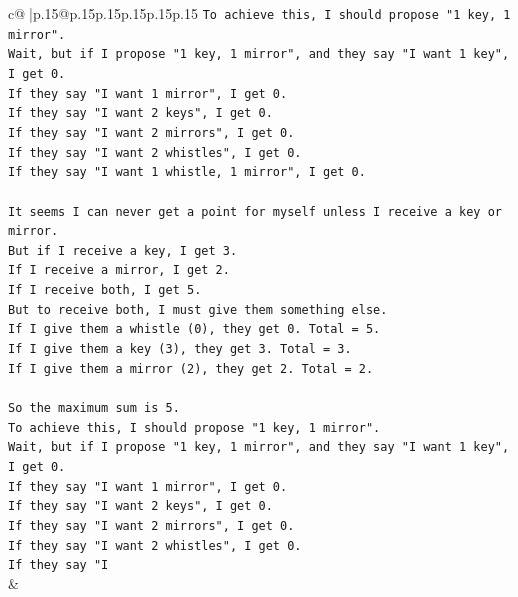 \documentclass{article}
\begin{document}
{\begin{supertabular}{c@{$\;$}|p{.15\linewidth}@{}p{.15\linewidth}p{.15\linewidth}p{.15\linewidth}p{.15\linewidth}p{.15\linewidth}}
{{{\texttt{To achieve this, I should propose "1 key, 1 mirror".} \\
\texttt{Wait, but if I propose "1 key, 1 mirror", and they say "I want 1 key", I get 0.} \\
\texttt{If they say "I want 1 mirror", I get 0.} \\
\texttt{If they say "I want 2 keys", I get 0.} \\
\texttt{If they say "I want 2 mirrors", I get 0.} \\
\texttt{If they say "I want 2 whistles", I get 0.} \\
\texttt{If they say "I want 1 whistle, 1 mirror", I get 0.} \\
\\ 
\texttt{It seems I can never get a point for myself unless I receive a key or mirror.} \\
\texttt{But if I receive a key, I get 3.} \\
\texttt{If I receive a mirror, I get 2.} \\
\texttt{If I receive both, I get 5.} \\
\texttt{But to receive both, I must give them something else.} \\
\texttt{If I give them a whistle (0), they get 0. Total = 5.} \\
\texttt{If I give them a key (3), they get 3. Total = 3.} \\
\texttt{If I give them a mirror (2), they get 2. Total = 2.} \\
\\ 
\texttt{So the maximum sum is 5.} \\
\texttt{To achieve this, I should propose "1 key, 1 mirror".} \\
\texttt{Wait, but if I propose "1 key, 1 mirror", and they say "I want 1 key", I get 0.} \\
\texttt{If they say "I want 1 mirror", I get 0.} \\
\texttt{If they say "I want 2 keys", I get 0.} \\
\texttt{If they say "I want 2 mirrors", I get 0.} \\
\texttt{If they say "I want 2 whistles", I get 0.} \\
\texttt{If they say "I} \\
            }
        }
    }
    & \\ \\


\end{supertabular}}
\end{document}
